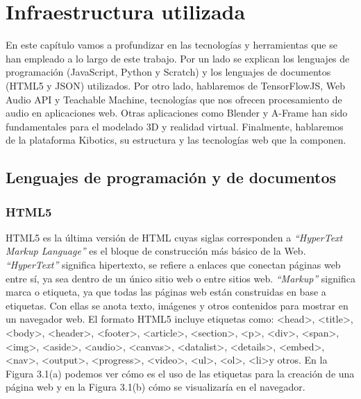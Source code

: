 \chapter{Infraestructura utilizada}
\label{infraestructura}
En este capítulo vamos a profundizar en las tecnologías y herramientas que se han empleado a lo largo de este trabajo. Por un lado se explican los lenguajes de programación (JavaScript, Python y Scratch) y los lenguajes de documentos (HTML5 y JSON)  utilizados. Por otro lado, hablaremos de TensorFlowJS, Web Audio API y Teachable Machine, tecnologías que nos ofrecen procesamiento de audio en aplicaciones web. Otras aplicaciones como Blender y A-Frame han sido fundamentales para el  modelado 3D y realidad virtual. Finalmente, hablaremos de la plataforma Kibotics, su estructura y las tecnologías web que la componen.
\section{Lenguajes de programación y de documentos}
\subsection{HTML5}
HTML5 es la última versión de HTML cuyas siglas corresponden a \textit{``HyperText Markup Language''} es el bloque de construcción más básico de la Web\cite{html}. \textit{``HyperText''} significa hipertexto, se refiere a enlaces que conectan páginas web entre sí, ya sea dentro de un único sitio web o entre sitios web. 
\textit{``Markup''} significa marca o etiqueta, ya que todas las páginas web están construidas en base a etiquetas. Con ellas se anota texto, imágenes y otros contenidos para mostrar en un navegador web. El formato HTML5 incluye etiquetas como:  \textless head\textgreater, \textless title\textgreater, \textless body\textgreater, \textless header\textgreater, \textless footer\textgreater, \textless article\textgreater, \textless section\textgreater, \textless p\textgreater, \textless div\textgreater, \textless span\textgreater, \textless img\textgreater, \textless aside\textgreater, \textless audio\textgreater, \textless canvas\textgreater, \textless datalist\textgreater, \textless details\textgreater, \textless embed\textgreater, \textless nav\textgreater, \textless output\textgreater, \textless progress\textgreater, \textless video\textgreater, \textless ul\textgreater, \textless ol\textgreater, \textless li\textgreater  y otros. En la Figura 3.1(a) podemos ver cómo es el uso de las etiquetas para la creación de una página web y en la Figura 3.1(b) cómo se visualizaría en el navegador.

